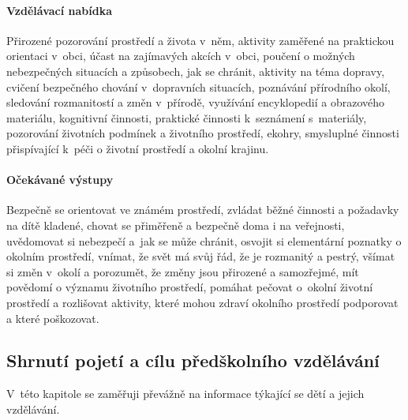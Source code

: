 				\paragraph{Vzdělávací nabídka}
					Přirozené pozorování prostředí a života v něm, aktivity zaměřené na praktickou orientaci v obci, účast na zajímavých akcích v obci, poučení o možných nebezpečných situacích a způsobech, jak se chránit, aktivity na téma dopravy, cvičení bezpečného chování v dopravních situacích, poznávání přírodního okolí, sledování rozmanitostí a změn v přírodě, využívání encyklopedií a obrazového materiálu, kognitivní činnosti, praktické činnosti k seznámení s materiály, pozorování životních podmínek a životního prostředí, ekohry, smysluplné činnosti přispívající k péči o životní prostředí a okolní krajinu.
				\paragraph{Očekávané výstupy}
					Bezpečně se orientovat ve známém prostředí, zvládat běžné činnosti a požadavky na dítě kladené, chovat se přiměřeně a bezpečně doma i na veřejnosti, uvědomovat si nebezpečí a jak se může chránit, osvojit si elementární poznatky o okolním prostředí, vnímat, že svět má svůj řád, že je rozmanitý a pestrý, všímat si změn v okolí a porozumět, že změny jsou přirozené a samozřejmé, mít povědomí o významu životního prostředí, pomáhat pečovat o okolní životní prostředí a rozlišovat aktivity, které mohou zdraví okolního prostředí podporovat a které poškozovat.

 			\subsection{Shrnutí pojetí a cílu předškolního vzdělávání}

				V této kapitole se zaměřuji převážně na informace týkající se dětí a jejich vzdělávání.

